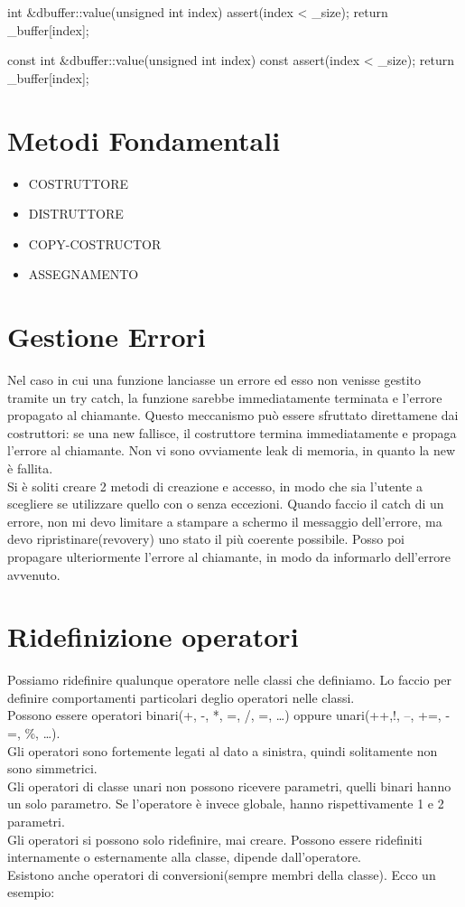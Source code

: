 \begin{cpp}
int &dbuffer::value(unsigned int index){
	assert(index < _size);
	return _buffer[index];
}

const int &dbuffer::value(unsigned int index) const{
	assert(index < _size);
	return _buffer[index];
}
\end{cpp}

\section{Metodi Fondamentali}
\begin{itemize}
\item COSTRUTTORE
\item DISTRUTTORE
\item COPY-COSTRUCTOR
\item ASSEGNAMENTO
\end{itemize}

\section{Gestione Errori}
Nel caso in cui una funzione lanciasse un errore ed esso non venisse gestito tramite un try catch, la funzione sarebbe immediatamente terminata e l'errore propagato al chiamante. Questo meccanismo può essere sfruttato direttamene dai costruttori: se una new fallisce, il costruttore termina immediatamente e propaga l'errore al chiamante. Non vi sono ovviamente leak di memoria, in quanto la new è fallita.\\
Si è soliti creare 2 metodi di creazione e accesso, in modo che sia l'utente a scegliere se utilizzare quello con o senza eccezioni.
Quando faccio il catch di un errore, non mi devo limitare a stampare a schermo il messaggio dell'errore, ma devo ripristinare(revovery) uno stato il più coerente possibile. Posso poi propagare ulteriormente l'errore al chiamante, in modo da informarlo dell'errore avvenuto.

\section{Ridefinizione operatori}
Possiamo ridefinire qualunque operatore nelle classi che definiamo. Lo faccio per definire comportamenti particolari deglio operatori nelle classi.\\
Possono essere operatori binari(+, -, *, =, /, =, \dots) oppure unari(++,!, --, +=, -=, \%, \dots).\\
Gli operatori sono fortemente legati al dato a sinistra, quindi solitamente non sono simmetrici.\\
Gli operatori di classe unari non possono ricevere parametri, quelli binari hanno un solo parametro. Se l'operatore è invece globale, hanno rispettivamente 1 e 2 parametri.\\
Gli operatori si possono solo ridefinire, mai creare.
Possono essere ridefiniti internamente o esternamente alla classe, dipende dall'operatore.\\
Esistono anche operatori di conversioni(sempre membri della classe).
Ecco un esempio:

